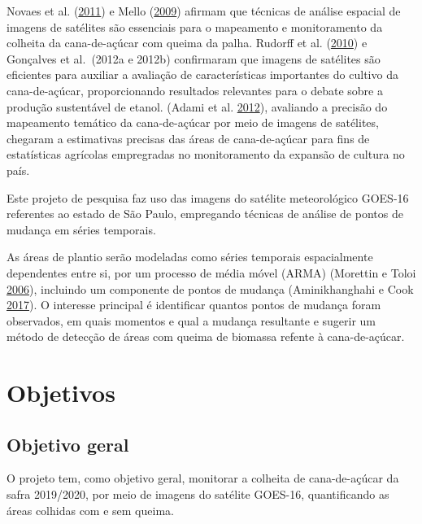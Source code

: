 \documentclass[11pt,brazil,]{article}
\providecommand{\DIFaddtex}[1]{{\protect\color{blue}\uwave{#1}}} %
\providecommand{\DIFaddbegin}{} %
\providecommand{\DIFaddend}{} %
\providecommand{\DIFadd}[1]{\texorpdfstring{\DIFaddtex{#1}}{#1}} %
\newcommand{\DIFaddincludegraphics}[2][]{{\color{blue}\fbox{\DIFOincludegraphics[#1]{#2}}}} %
\DeclareRobustCommand{\DIFaddbegin}{\DIFOaddbegin \let\includegraphics\DIFaddincludegraphics} %
\DeclareRobustCommand{\DIFaddend}{\DIFOaddend \let\includegraphics\DIFOincludegraphics} %
\begin{document}
Novaes et al. (\protect\hyperlink{ref-protocloagro}{2011}) e Mello
(\protect\hyperlink{ref-orbitainpe}{2009}) afirmam que técnicas de
análise espacial de imagens de satélites são essenciais para o
mapeamento e monitoramento da colheita da cana-de-açúcar com queima da
palha. Rudorff et al. (\protect\hyperlink{ref-rudorff2010studies}{2010})
e Gonçalves et al.~(2012a e 2012b) confirmaram que imagens de satélites
são eficientes para auxiliar a avaliação de características importantes
do cultivo da cana-de-açúcar, proporcionando resultados relevantes para
o debate sobre a produção sustentável de etanol. (Adami et al.
\protect\hyperlink{ref-sugarcanesouth}{2012}), avaliando a precisão do
mapeamento temático da cana-de-açúcar por meio de imagens de satélites,
chegaram a estimativas precisas das áreas de cana-de-açúcar para fins de
estatísticas agrícolas empregradas no monitoramento da expansão de
cultura no país.

Este projeto de pesquisa faz uso das imagens do satélite meteorológico
GOES-16 referentes ao estado de São Paulo, empregando técnicas de
análise de pontos de mudança em séries temporais.

As áreas de plantio serão modeladas como séries temporais espacialmente
dependentes entre si, por um processo de média móvel (ARMA) (\DIFaddbegin \DIFadd{uma
referência recente é }\DIFaddend Morettin e Toloi
\protect\hyperlink{ref-morettin2006analise}{2006}), incluindo um
componente de pontos de mudança (Aminikhanghahi e Cook
\protect\hyperlink{ref-aminikhanghahi2017survey}{2017}). O interesse
principal é identificar quantos pontos de mudança foram observados, em
quais momentos e qual a mudança resultante e sugerir um método de
detecção de áreas com queima de biomassa refente à cana-de-açúcar.

\hypertarget{objetivos}{%
\section{Objetivos}\label{objetivos}}

\hypertarget{objetivo-geral}{%
\subsection{Objetivo geral}\label{objetivo-geral}}

O projeto tem, como objetivo geral, monitorar a colheita de
cana-de-açúcar da safra 2019/2020, por meio de imagens do satélite
GOES-16, quantificando as áreas colhidas com e sem queima.
\end{document}
